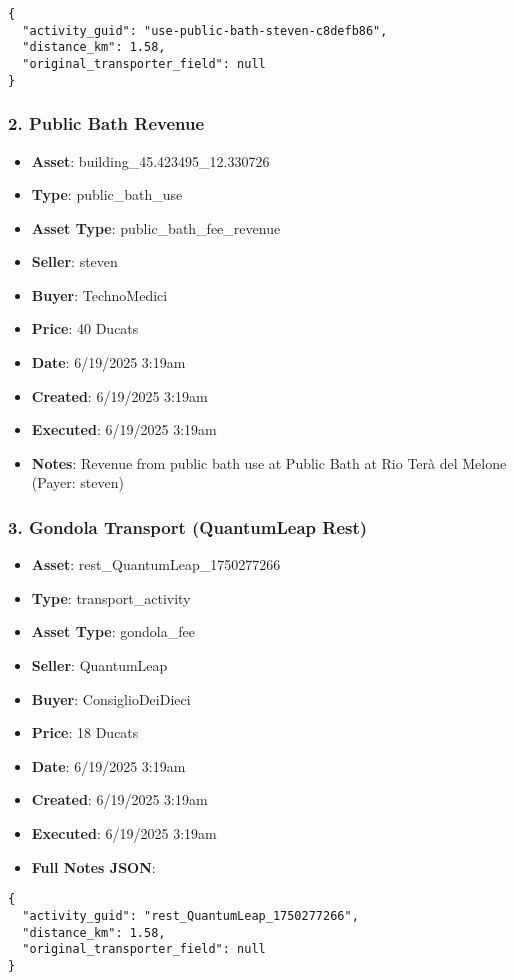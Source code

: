 \documentclass[11pt,a4paper]{article}
\begin{document}
\begin{lstlisting}
{
  "activity_guid": "use-public-bath-steven-c8defb86",
  "distance_km": 1.58,
  "original_transporter_field": null
}
\end{lstlisting}

\subsubsection{2. Public Bath Revenue}

\begin{itemize}
\item \textbf{Asset}: building\_45.423495\_12.330726
\item \textbf{Type}: public\_bath\_use
\item \textbf{Asset Type}: public\_bath\_fee\_revenue
\item \textbf{Seller}: steven
\item \textbf{Buyer}: TechnoMedici
\item \textbf{Price}: 40 Ducats
\item \textbf{Date}: 6/19/2025 3:19am
\item \textbf{Created}: 6/19/2025 3:19am
\item \textbf{Executed}: 6/19/2025 3:19am
\item \textbf{Notes}: Revenue from public bath use at Public Bath at Rio Terà del Melone (Payer: steven)
\end{itemize}

\subsubsection{3. Gondola Transport (QuantumLeap Rest)}

\begin{itemize}
\item \textbf{Asset}: rest\_QuantumLeap\_1750277266
\item \textbf{Type}: transport\_activity
\item \textbf{Asset Type}: gondola\_fee
\item \textbf{Seller}: QuantumLeap
\item \textbf{Buyer}: ConsiglioDeiDieci
\item \textbf{Price}: 18 Ducats
\item \textbf{Date}: 6/19/2025 3:19am
\item \textbf{Created}: 6/19/2025 3:19am
\item \textbf{Executed}: 6/19/2025 3:19am
\item \textbf{Full Notes JSON}:
\end{itemize}

\begin{lstlisting}
{
  "activity_guid": "rest_QuantumLeap_1750277266",
  "distance_km": 1.58,
  "original_transporter_field": null
}
\end{lstlisting}
\end{document}
